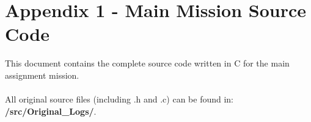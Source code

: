 \documentclass[12pt]{article}
\begin{document}
\section*{Appendix 1 - Main Mission Source Code}

This document contains the complete source code written in C for the main assignment mission.\\\\
All original source files (including .h and .c) can be found in: \textbf{/src/Original\_Logs/}.
\end{document}
